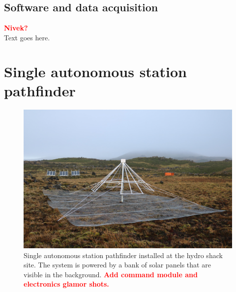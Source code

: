 \documentclass{ws-jai}
\newcommand{\attention}[1]{\textcolor{red}{\bf {#1}}}
\begin{document}
\subsection{Software and data acquisition}
\attention{Nivek?} \\
Text goes here.

\section{Single autonomous station pathfinder}

\begin{figure}
  \begin{center}
    \includegraphics[width=0.7\linewidth]{Figures/autonomous.jpg}
    \caption{Single autonomous station pathfinder installed at the
      hydro shack site.  The system is powered by a bank of solar
      panels that are visible in the background.  \attention{
        Add command module and electronics glamor shots.}}
    \label{Fig:autonomous}
  \end{center}
\end{figure}
\end{document}
